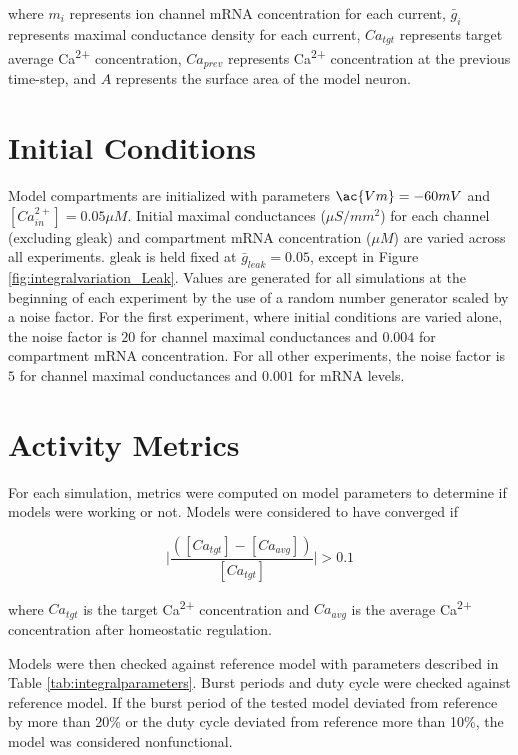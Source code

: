 where $m_i$ represents ion channel mRNA concentration for each current, $\bar{g}_i$ represents maximal conductance density for each current, $Ca_{tgt}$ represents target average Ca\textsuperscript{2+} concentration, $Ca_{prev}$ represents Ca\textsuperscript{2+} concentration at the previous time-step, and $A$ represents the surface area of the model neuron.

\section{Initial Conditions} \label{initialconditions}

Model compartments are initialized with parameters $\ac{Vm} = -60 mV$ and $[Ca^{2+}_{in}] = 0.05 \mu M$.
Initial maximal conductances ($\mu S/mm^2$) for each channel (excluding \ac{gleak}) and compartment mRNA concentration ($\mu M$) are varied across all experiments. \ac{gleak} is held fixed at $\bar{g}_{leak} = 0.05$, except in Figure \ref{fig:integralvariation_Leak}.
Values are generated for all simulations at the beginning of each experiment by the use of a random number generator scaled by a noise factor.
For the first experiment, where initial conditions are varied alone, the noise factor is $20$ for channel maximal conductances and $0.004$ for compartment mRNA concentration. For all other experiments, the noise factor is $5$ for channel maximal conductances and $0.001$ for mRNA levels.

\section{Activity Metrics} \label{electrophys}

For each simulation, metrics were computed on model parameters to determine if models were working or not. Models were considered to have converged if

\begin{equation}
    \mid \frac{([Ca_{tgt}] - [Ca_{avg}])}{[Ca_{tgt}]} \mid > 0.1
\end{equation}

where $Ca_{tgt}$ is the target Ca\textsuperscript{2+} concentration and $Ca_{avg}$ is the average Ca\textsuperscript{2+} concentration after homeostatic regulation.

Models were then checked against reference model with parameters described in Table \ref{tab:integralparameters}. Burst periods and duty cycle were checked against reference model. If the burst period of the tested model deviated from reference by more than 20\% or the duty cycle deviated from reference more than 10\%, the model was considered nonfunctional.

